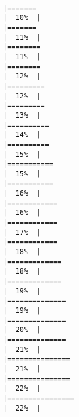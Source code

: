 \documentclass[12pt,twoside]{reedthesis}
\begin{document}
\begin{verbatim}
                                                                            |=======                                                               |  10%  |                                                                              |=======                                                               |  11%  |                                                                              |========                                                              |  11%  |                                                                              |========                                                              |  12%  |                                                                              |=========                                                             |  12%  |                                                                              |=========                                                             |  13%  |                                                                              |==========                                                            |  14%  |                                                                              |==========                                                            |  15%  |                                                                              |===========                                                           |  15%  |                                                                              |===========                                                           |  16%  |                                                                              |============                                                          |  16%  |                                                                              |============                                                          |  17%  |                                                                              |============                                                          |  18%  |                                                                              |=============                                                         |  18%  |                                                                              |=============                                                         |  19%  |                                                                              |==============                                                        |  19%  |                                                                              |==============                                                        |  20%  |                                                                              |==============                                                        |  21%  |                                                                              |===============                                                       |  21%  |                                                                              |===============                                                       |  22%  |                                                                              |================                                                      |  22%  |   
\end{verbatim}
\end{document}
